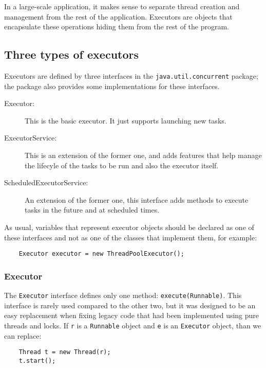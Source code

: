 In a large-scale application, it makes sense to separate thread
creation and management from the rest of the application. Executors
are objects that encapsulate these operations hiding them from the
rest of the program. 

\subsection{Three types of executors}
\label{sec:three-types-exec}

Executors are defined by three interfaces in the
\verb+java.util.concurrent+ package; the package also provides some
implementations for these interfaces. 

\begin{description}
\item[Executor: ] This is the basic executor. It just supports
  launching new tasks.
\item[ExecutorService: ] This is an extension of the former one, and
  adds features that help manage the lifecyle of the tasks to be run
  and also the executor itself.
\item[ScheduledExecutorService: ] An extension of the former one, this
  interface adds methods to execute tasks in the future and at
  scheduled times. 
\end{description}

As usual, variables that represent executor objects should be declared
as one of these interfaces and not as one of the classes that
implement them, for example: 

\begin{verbatim}
    Executor executor = new ThreadPoolExecutor();
\end{verbatim}

\subsubsection{Executor}
\label{sec:executor}

The \verb+Executor+ interface defines only one method:
\verb+execute(Runnable)+. This interface is rarely used compared to
the other two, but it was designed to be an easy replacement when
fixing legacy code that had been implemented using pure threads and
locks. If \verb+r+ is a \verb+Runnable+ object and \verb+e+ is an
\verb+Executor+ object, than we can replace:

\begin{verbatim}
    Thread t = new Thread(r);
    t.start();
\end{verbatim}

